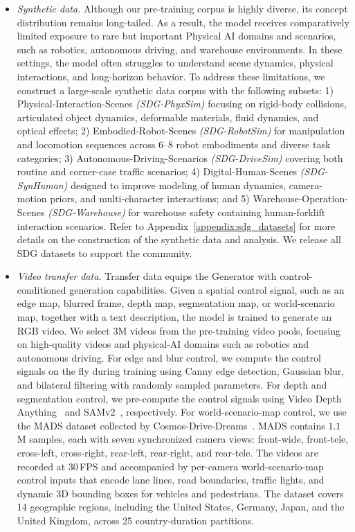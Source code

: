 \documentclass{llmxive}
\begin{document}
\begin{itemize}
\item \textit{Synthetic data.} Although our pre-training corpus is highly diverse, its concept distribution remains long-tailed. As a result, the model receives comparatively limited exposure to rare but important Physical AI domains and scenarios, such as robotics, autonomous driving, and warehouse environments. In these settings, the model often struggles to understand scene dynamics, physical interactions, and long-horizon behavior. To address these limitations, we construct a large-scale synthetic data corpus with the following subsets: 1) Physical-Interaction-Scenes \textit{(SDG-PhyxSim)} focusing on rigid-body collisions, articulated object dynamics, deformable materials, fluid dynamics, and optical effects; 2) Embodied-Robot-Scenes \textit{(SDG-RobotSim)} for manipulation and locomotion sequences across 6--8 robot embodiments and diverse task categories; 3) Autonomous-Driving-Scenarios \textit{(SDG-DriveSim)} covering both routine and corner-case traffic scenarios; 4) Digital-Human-Scenes \textit{(SDG-SynHuman)} designed to improve modeling of human dynamics, camera-motion priors, and multi-character interactions; and 5) Warehouse-Operation-Scenes \textit{(SDG-Warehouse)} for warehouse safety containing human-forklift interaction scenarios. Refer to Appendix~\ref{appendix:sdg_datasets} for more details on the construction of the synthetic data and analysis. We release all SDG datasets to support the community.

\item \textit{Video transfer data.} Transfer data equips the Generator with control-conditioned generation capabilities. Given a spatial control signal, such as an edge map, blurred frame, depth map, segmentation map, or world-scenario map, together with a text description, the model is trained to generate an RGB video. We select $3$M videos from the pre-training video pools, focusing on high-quality videos and physical-AI domains such as robotics and autonomous driving. For edge and blur control, we compute the control signals on the fly during training using Canny edge detection, Gaussian blur, and bilateral filtering with randomly sampled parameters. For depth and segmentation control, we pre-compute the control signals using Video Depth Anything~\citep{chen2025videodepth} and SAMv2~\citep{ravi2024sam}, respectively. For world-scenario-map control, we use the MADS dataset collected by Cosmos-Drive-Dreams~\citep{ren2025cosmos}. MADS contains $1.1$M samples, each with seven synchronized camera views: front-wide, front-tele, cross-left, cross-right, rear-left, rear-right, and rear-tele. The videos are recorded at $30$\,FPS and accompanied by per-camera world-scenario-map control inputs that encode lane lines, road boundaries, traffic lights, and dynamic 3D bounding boxes for vehicles and pedestrians. The dataset covers 14 geographic regions, including the United States, Germany, Japan, and the United Kingdom, across 25 country-duration partitions.
\end{itemize}
\end{document}
